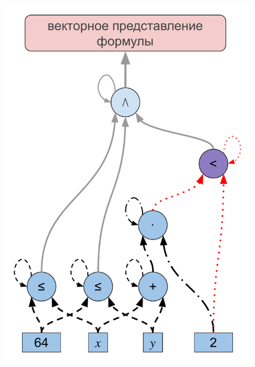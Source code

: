 \documentclass[14pt,aspectratio=169,hyperref={pdftex,unicode},xcolor=dvipsnames]{beamer}
\begin{document}
\begin{frame}[noframenumbering]

\begin{center}
  \includegraphics[scale=0.45]{./assets/formula-ast-talk-3.pdf}
\end{center}

\end{frame}
\end{document}
